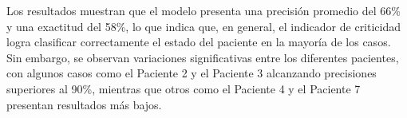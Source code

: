 \begin{table}[H]
  \centering
  \caption{Resultados cuantitativos de la validación del modelo de detección de anomalías en subespacios.}
  \label{tab:resultados_cuantitativos}
\end{table}

Los resultados muestran que el modelo presenta una precisión promedio del 66\% y una exactitud del 58\%, lo que indica que, en general, el indicador de criticidad logra clasificar correctamente el estado del paciente en la mayoría de los casos. Sin embargo, se observan variaciones significativas entre los diferentes pacientes, con algunos casos como el Paciente 2 y el Paciente 3 alcanzando precisiones superiores al 90\%, mientras que otros como el Paciente 4 y el Paciente 7 presentan resultados más bajos.

